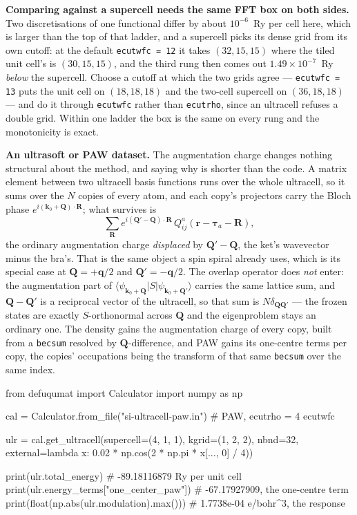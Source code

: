\documentclass[11pt,a4paper]{article}
\newcommand{\code}[1]{\texttt{\small #1}}
\begin{document}
\textbf{Comparing against a supercell needs the same FFT box on both sides.}
Two discretisations of one functional differ by about $10^{-6}$~Ry per cell
here, which is larger than the top of that ladder, and a supercell picks its
dense grid from its own cutoff: at the default \code{ecutwfc = 12} it takes
$(32,15,15)$ where the tiled unit cell's is $(30,15,15)$, and the third rung
then comes out $1.49\times10^{-7}$~Ry \emph{below} the supercell. Choose a
cutoff at which the two grids agree --- \code{ecutwfc = 13} puts the unit cell on
$(18,18,18)$ and the two-cell supercell on $(36,18,18)$ --- and do it through
\code{ecutwfc} rather than \code{ecutrho}, since an ultracell refuses a double
grid. Within one ladder the box is the same on every rung and the monotonicity
is exact.

\textbf{An ultrasoft or PAW dataset.} The augmentation charge changes nothing
structural about the method, and saying why is shorter than the code. A matrix
element between two ultracell basis functions runs over the whole ultracell, so
it sums over the $N$ copies of every atom, and each copy's projectors carry the
Bloch phase $e^{i(\mathbf k_0+\mathbf Q)\cdot\mathbf R}$; what survives is
\[
  \sum_{\mathbf R} e^{i(\mathbf Q'-\mathbf Q)\cdot\mathbf R}\,
  Q^a_{ij}(\mathbf r - \boldsymbol\tau_a - \mathbf R),
\]
the ordinary augmentation charge \emph{displaced} by $\mathbf Q' - \mathbf Q$,
the ket's wavevector minus the bra's. That is the same object a spin spiral
already uses, which is its special case at $\mathbf Q = +\mathbf q/2$ and
$\mathbf Q' = -\mathbf q/2$. The overlap operator does \emph{not} enter: the
augmentation part of $\langle\psi_{\mathbf k_0+\mathbf Q}|S|
\psi_{\mathbf k_0+\mathbf Q'}\rangle$ carries the same lattice sum, and
$\mathbf Q - \mathbf Q'$ is a reciprocal vector of the ultracell, so that sum is
$N\delta_{\mathbf Q\mathbf Q'}$ --- the frozen states are exactly
$S$-orthonormal across $\mathbf Q$ and the eigenproblem stays an ordinary one.
The density gains the augmentation charge of every copy, built from a
\code{becsum} resolved by $\mathbf Q$-difference, and PAW gains its one-centre
terms per copy, the copies' occupations being the transform of that same
\code{becsum} over the same index.

\begin{pycode}
from defuqumat import Calculator
import numpy as np

cal = Calculator.from_file("si-ultracell-paw.in")   # PAW, ecutrho = 4 ecutwfc

ulr = cal.get_ultracell(supercell=(4, 1, 1), kgrid=(1, 2, 2), nbnd=32,
                        external=lambda x: 0.02 * np.cos(2 * np.pi * x[..., 0] / 4))

print(ulr.total_energy)                       # -89.18116879 Ry per unit cell
print(ulr.energy_terms["one_center_paw"])     # -67.17927909, the one-centre term
print(float(np.abs(ulr.modulation).max()))    # 1.7738e-04 e/bohr^3, the response
\end{pycode}
\end{document}

